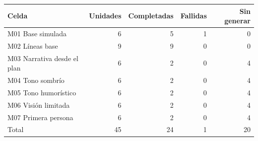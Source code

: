 \begin{tabular}{@{}lrrrr@{}}
\toprule
Celda & Unidades & Completadas & Fallidas & Sin generar \\
\midrule
M01 Base simulada & 6 & 5 & 1 & 0 \\
M02 Líneas base & 9 & 9 & 0 & 0 \\
M03 Narrativa desde el plan & 6 & 2 & 0 & 4 \\
M04 Tono sombrío & 6 & 2 & 0 & 4 \\
M05 Tono humorístico & 6 & 2 & 0 & 4 \\
M06 Visión limitada & 6 & 2 & 0 & 4 \\
M07 Primera persona & 6 & 2 & 0 & 4 \\
Total & 45 & 24 & 1 & 20 \\
\bottomrule
\end{tabular}
